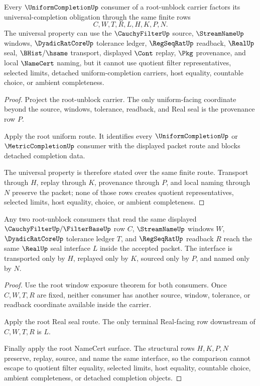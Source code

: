 \begin{theorem}
\label{thm:cauchy-filter-completion-uniform-completion-universal-property}
Every $\UniformCompletionUp$ consumer of a root-unblock carrier factors its universal-completion obligation through the same finite rows
$$
C,W,T,R,L,H,K,P,N .
$$
The universal property can use the $\CauchyFilterUp$ source, $\StreamNameUp$ windows, $\DyadicRatCoreUp$ tolerance ledger, $\RegSeqRatUp$ readback, $\RealUp$ seal, $\BHist/\hsame$ transport, displayed $\Cont$ replay, $\Pkg$ provenance, and local $\NameCert$ naming, but it cannot use quotient filter representatives, selected limits, detached uniform-completion carriers, host equality, countable choice, or ambient completeness.
\end{theorem}
\begin{proof}
Project the root-unblock carrier. The only uniform-facing coordinate beyond the source, windows, tolerance, readback, and Real seal is the provenance row $P$.

Apply the root uniform route. It identifies every $\UniformCompletionUp$ or $\MetricCompletionUp$ consumer with the displayed packet route and blocks detached completion data.

The universal property is therefore stated over the same finite route. Transport through $H$, replay through $K$, provenance through $P$, and local naming through $N$ preserve the packet; none of those rows creates quotient representatives, selected limits, host equality, choice, or ambient completeness.
\end{proof}

\begin{theorem}
\label{thm:cauchy-filter-completion-real-seal-uniqueness-interface}
Any two root-unblock consumers that read the same displayed $\CauchyFilterUp/\FilterBaseUp$ row $C$, $\StreamNameUp$ windows $W$, $\DyadicRatCoreUp$ tolerance ledger $T$, and $\RegSeqRatUp$ readback $R$ reach the same $\RealUp$ seal interface $L$ inside the accepted packet. The interface is transported only by $H$, replayed only by $K$, sourced only by $P$, and named only by $N$.
\end{theorem}
\begin{proof}
Use the root window exposure theorem for both consumers. Once $C,W,T,R$ are fixed, neither consumer has another source, window, tolerance, or readback coordinate available inside the carrier.

Apply the root Real seal route. The only terminal Real-facing row downstream of $C,W,T,R$ is $L$.

Finally apply the root NameCert surface. The structural rows $H,K,P,N$ preserve, replay, source, and name the same interface, so the comparison cannot escape to quotient filter equality, selected limits, host equality, countable choice, ambient completeness, or detached completion objects.
\end{proof}

